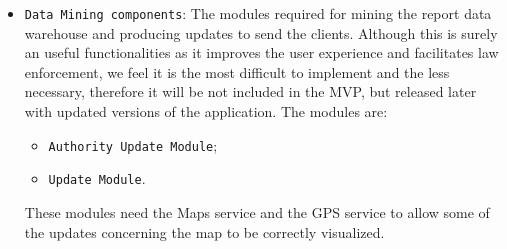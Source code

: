 \documentclass[12pt,a4paper]{article}
\begin{document}
\begin{itemize}
\item \texttt{Data Mining components}: The modules required for mining the report data warehouse and producing updates to send the clients. Although this is surely an useful functionalities as it improves the user experience and facilitates law enforcement, we feel it is the most difficult to implement and the less necessary, therefore it will be not included in the MVP, but released later with updated versions of the application. The modules are:
\begin{itemize}
\item \texttt{Authority Update Module};
\item \texttt{Update Module}.
\end{itemize}
These modules need the Maps service and the GPS service to allow some of the updates concerning the map to be correctly visualized.
\end{itemize}
\end{document}
